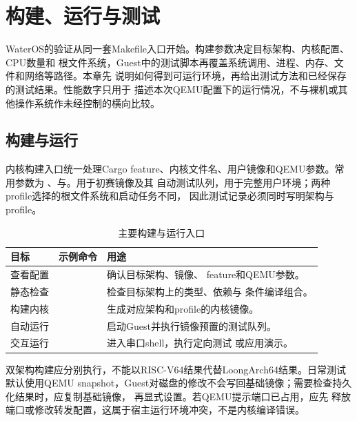 \chapter{构建、运行与测试}

WaterOS的验证从同一套Makefile入口开始。构建参数决定目标架构、内核配置、CPU数量和
根文件系统，Guest中的测试脚本再覆盖系统调用、进程、内存、文件和网络等路径。本章先
说明如何得到可运行环境，再给出测试方法和已经保存的测试结果。性能数字只用于
描述本次QEMU配置下的运行情况，不与裸机或其他操作系统作未经控制的横向比较。

\section{构建与运行}

内核构建入口统一处理Cargo feature、内核文件名、用户镜像和QEMU参数。常用参数为
、与。用于初赛镜像及其
自动测试队列，用于完整用户环境；两种profile选择的根文件系统和启动任务不同，
因此测试记录必须同时写明架构与profile。

\begin{table}[htbp]
  \centering
  \caption{主要构建与运行入口}
  \label{tab:build-entry}
  \begin{tabularx}{\textwidth}{L{3.0cm}L{4.8cm}Y}
    \toprule
    目标 & 示例命令 & 用途 \\
    \midrule
    查看配置 &  & 确认目标架构、镜像、
    feature和QEMU参数。\\
    静态检查 &  & 检查目标架构上的类型、依赖与
    条件编译组合。\\
    构建内核 &  & 生成对应架构和profile的内核镜像。\\
    自动运行 &  & 启动Guest并执行镜像预置的测试队列。\\
    交互运行 &  & 进入串口shell，执行定向测试
    或应用演示。\\
    \bottomrule
  \end{tabularx}
\end{table}

双架构构建应分别执行，不能以RISC-V64结果代替LoongArch64结果。日常测试默认使用QEMU
snapshot，Guest对磁盘的修改不会写回基础镜像；需要检查持久化结果时，应复制基础镜像，
再显式设置。若QEMU提示端口已占用，应先
释放端口或修改转发配置，这属于宿主运行环境冲突，不是内核编译错误。

